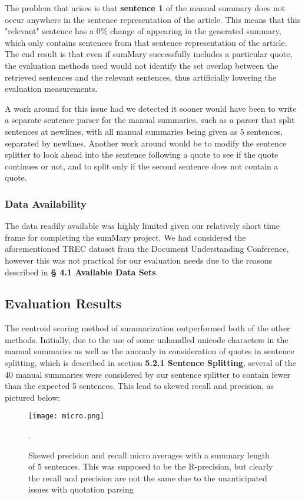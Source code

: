 \documentclass[11pt,a4paper]{article}
\begin{document}
  The problem that arises is that \textbf{sentence 1} of the manual summary does not occur anywhere in the sentence representation of the article. This means that this "relevant" sentence has a 0\% change of appearing in the generated summary, which only contains sentences from that sentence representation of the article. The end result is that even if sumMary successfully includes a particular quote, the evaluation methods used would not identify the set overlap between the retrieved sentences and the relevant sentences, thus artificially lowering the evaluation measurements.

  A work around for this issue had we detected it sooner would have been to write a separate sentence parser for the manual summaries, such as a parser that split sentences at newlines, with all manual summaries being given as 5 sentences, separated by newlines. Another work around would be to modify the sentence splitter to look ahead into the sentence following a quote to see if the quote continues or not, and to split only if the second sentence does not contain a quote.

  \subsubsection{Data Availability}
  The data readily available was highly limited given our relatively short time frame for completing the sumMary project. We had considered the aforementioned TREC dataset from the Document Understanding Conference, however this was not practical for our evaluation needs due to the reasons described in \textbf{§ 4.1 Available Data Sets}.

  \subsection{Evaluation Results}
  The centroid scoring method of summarization outperformed both of the other methods. Initially, due to the use of some unhandled unicode characters in the manual summaries as well as the anomaly in consideration of quotes in sentence splitting, which is described in section \textbf{5.2.1 Sentence Splitting}, several of the 40 manual summaries were considered by our sentence splitter to contain fewer than the expected 5 sentences. This lead to skewed recall and precision, as pictured below:


  \begin{figure}[htp]
  \texttt{[image: micro.png]}
  \caption {Skewed precision and recall micro averages with a summary length of 5 sentences. This was supposed to be the R-precision, but clearly the recall and precision are not the same due to the unanticipated issues with quotation parsing}.
  \end{figure}
\end{document}
